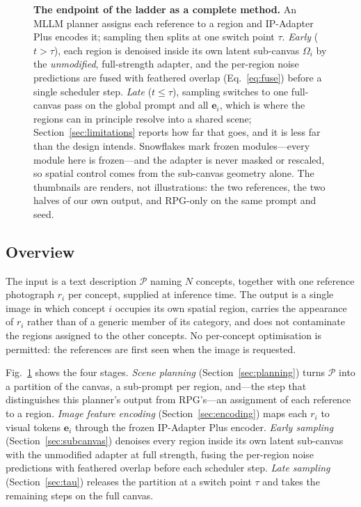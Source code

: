 \documentclass[review,10pt,times]{elsarticle}
\begin{document}
\begin{figure}[H]
  \centering
  \makebox[\linewidth][c]{}
  \caption{%
    \textbf{The endpoint of the ladder as a complete method.}
    An MLLM planner assigns each reference to a region and IP-Adapter Plus
    encodes it; sampling then splits at one switch point $\tau$.
    \emph{Early} ($t>\tau$), each region is denoised inside its own latent
    sub-canvas $\Omega_i$ by the \emph{unmodified}, full-strength adapter, and
    the per-region noise predictions are fused with feathered overlap
    (Eq.~\ref{eq:fuse}) before a single scheduler step.
    \emph{Late} ($t\le\tau$), sampling switches to one full-canvas pass on the
    global prompt and all $\mathbf{e}_i$, which is where the regions can in
    principle resolve into a shared scene; Section~\ref{sec:limitations}
    reports how far that goes, and it is less far than the design intends.
    Snowflakes mark frozen modules---every module here is frozen---and the
    adapter is never masked or rescaled, so spatial control comes from the
    sub-canvas geometry alone.  The thumbnails are renders, not illustrations:
    the two references, the two halves of our own output, and RPG-only on the
    same prompt and seed.
  }
  \label{fig:method}
\end{figure}

\subsection{Overview}
\label{sec:overview}

The input is a text description $\mathcal{P}$ naming $N$ concepts, together
with one reference photograph $r_i$ per concept, supplied at inference time.
The output is a single image in which concept $i$ occupies its own spatial
region, carries the appearance of $r_i$ rather than of a generic member of
its category, and does not contaminate the regions assigned to the other
concepts.  No per-concept optimisation is permitted: the references are first
seen when the image is requested.

Fig.~\ref{fig:method} shows the four stages.  \emph{Scene planning}
(Section~\ref{sec:planning}) turns $\mathcal{P}$ into a partition of the
canvas, a sub-prompt per region, and---the step that distinguishes this
planner's output from RPG's---an assignment of each reference to a region.
\emph{Image feature encoding} (Section~\ref{sec:encoding}) maps each $r_i$ to
visual tokens $\mathbf{e}_i$ through the frozen IP-Adapter Plus encoder.
\emph{Early sampling} (Section~\ref{sec:subcanvas}) denoises every region
inside its own latent sub-canvas with the unmodified adapter at full
strength, fusing the per-region noise predictions with feathered overlap
before each scheduler step.  \emph{Late sampling} (Section~\ref{sec:tau})
releases the partition at a switch point $\tau$ and takes the remaining steps
on the full canvas.
\end{document}
